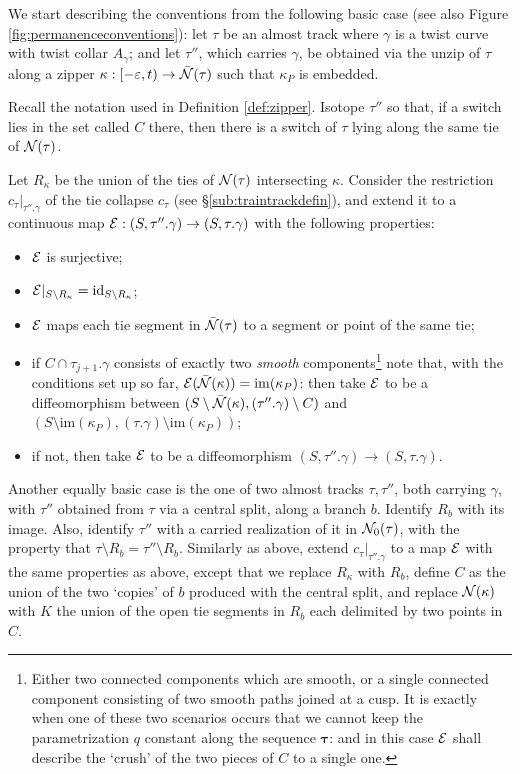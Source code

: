 \begin{rmk}
We start describing the conventions from the following basic case (see also Figure \ref{fig:permanenceconventions}): let $\tau$ be an almost track where $\gamma$ is a twist curve with twist collar $A_\gamma$; and let $\tau''$, which carries $\gamma$, be obtained via the unzip of $\tau$ along a zipper $\kappa: [-\varepsilon, t)\rightarrow \bar{{\mathcal N}}(\tau)$ such that $\kappa_P$ is embedded.

Recall the notation used in Definition \ref{def:zipper}. Isotope $\tau''$ so that, if a switch lies in the set called $C$ there, then there is a switch of $\tau$ lying along the same tie of ${\mathcal N}(\tau)$.

Let $R_\kappa$ be the union of the ties of ${\mathcal N}(\tau)$ intersecting $\kappa$. Consider the restriction $c_\tau|_{\tau''.\gamma}$ of the tie collapse $c_\tau$ (see \S \ref{sub:traintrackdefin}), and extend it to a continuous map $\mathcal{E}:(S,\tau''.\gamma)\rightarrow (S,\tau.\gamma)$ with the following properties:
\begin{itemize}
\item $\mathcal{E}$ is surjective;
\item $\mathcal{E}|_{S\setminus R_\kappa}=\mathrm{id}_{S\setminus R_\kappa}$;
\item $\mathcal{E}$ maps each tie segment in $\bar{{\mathcal N}}(\tau)$ to a segment or point of the same tie;
\item if $C\cap\tau_{j+1}.\gamma$ consists of exactly two \emph{smooth} components\footnote{Either two connected components which are smooth, or a single connected component consisting of two smooth paths joined at a cusp. It is exactly when one of these two scenarios occurs that we cannot keep the parametrization $q$ constant along the sequence $\bm\tau$: and in this case $\mathcal{E}$ shall describe the `crush' of the two pieces of $C$ to a single one.} note that, with the conditions set up so far, $\mathcal{E}(\bar{{\mathcal N}}(\kappa))=\mathrm{im}(\kappa_P)$: then take $\mathcal{E}$ to be a diffeomorphism between $(S\setminus \bar{{\mathcal N}}(\kappa),(\tau''.\gamma)\setminus C)$ and $(S\setminus\mathrm{im}(\kappa_P),(\tau.\gamma) \setminus\mathrm{im}(\kappa_P))$;
\item if not, then take $\mathcal{E}$ to be a diffeomorphism $(S,\tau''.\gamma)\rightarrow (S,\tau.\gamma)$.
\end{itemize}

Another equally basic case is the one of two almost tracks $\tau,\tau''$, both carrying $\gamma$, with $\tau''$ obtained from $\tau$ via a central split, along a branch $b$. Identify $R_b$ with its image. Also, identify $\tau''$ with a carried realization of it in ${\mathcal N}_0(\tau)$, with the property that $\tau\setminus R_b=\tau''\setminus R_b$. Similarly as above, extend $c_\tau|_{\tau''.\gamma}$ to a map $\mathcal{E}$ with the same properties as above, except that we replace $R_\kappa$ with $R_b$, define $C$ as the union of the two `copies' of $b$ produced with the central split, and replace ${\mathcal N}(\kappa)$ with $K$ the union of the open tie segments in $R_b$ each delimited by two points in $C$.


\end{rmk}
